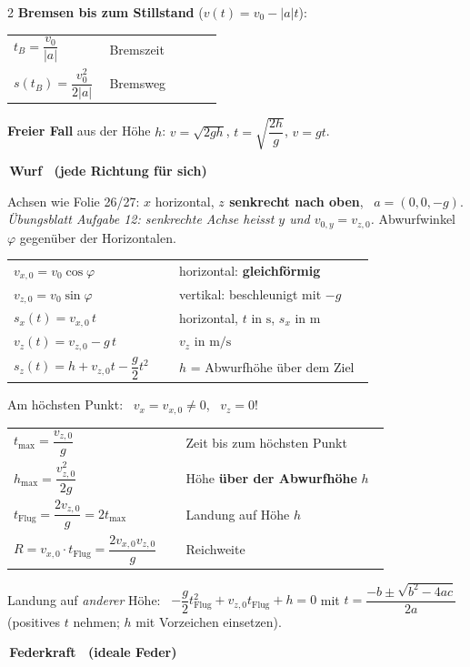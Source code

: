 \documentclass[8pt,a4paper]{extarticle}
\makeatletter
\newcommand{\T}[1]{%
  \vspace{2.2mm plus 0.6mm}%
  \noindent\colorbox{ak}{\color{white}\bfseries\small\,#1\,}\par
  \vspace{0.8mm}\nobreak\ignorespaces}
\newcommand{\FT}[1]{%
  \begin{tabular}{@{}>{\raggedright\arraybackslash}p{0.44\linewidth}@{\hspace{3pt}}>{\raggedright\arraybackslash}p{0.52\linewidth}@{}}
  #1\end{tabular}\par}
\newcommand{\hk}[1]{\textcolor{ak}{\textbf{#1}}}
\makeatother
\begin{document}
\begin{multicols}{2}
\vspace{0.8mm}
\hk{Bremsen bis zum Stillstand} ($v(t)=v_0-|a|t$):

\FT{
$t_B = \dfrac{v_0}{|a|}$ & Bremszeit \\
$s(t_B) = \dfrac{v_0^2}{2|a|}$ & Bremsweg \\
}

\vspace{0.8mm}
\hk{Freier Fall} aus der Höhe $h$: \quad
$v=\sqrt{2gh}$, \quad $t=\sqrt{\dfrac{2h}{g}}$, \quad $v=gt$.

\T{Wurf \ (jede Richtung für sich)}

Achsen wie Folie 26/27: $x$ horizontal, \textbf{$z$ senkrecht nach oben}, \ $a=(0,0,-g)$.
\emph{Übungsblatt Aufgabe 12: senkrechte Achse heisst $y$ und $v_{0,y} = v_{z,0}$.}
Abwurfwinkel $\varphi$ gegenüber der Horizontalen.

\FT{
$v_{x,0} = v_0\cos\varphi$ & horizontal: \textbf{gleichförmig} \\
$v_{z,0} = v_0\sin\varphi$ & vertikal: beschleunigt mit $-g$ \\
$s_x(t) = v_{x,0}\,t$ & horizontal, $t$ in $\mathrm{s}$, $s_x$ in $\mathrm{m}$ \\
$v_z(t) = v_{z,0}-g\,t$ & $v_z$ in $\mathrm{m/s}$ \\
$s_z(t) = h+v_{z,0}t-\dfrac{g}{2}t^2$ & $h$ = Abwurfhöhe über dem Ziel \\
}

\vspace{0.8mm}
Am höchsten Punkt: \ $v_x = v_{x,0}\neq0$, \ $v_z = 0$!

\FT{
$t_{\text{max}} = \dfrac{v_{z,0}}{g}$ & Zeit bis zum höchsten Punkt \\
$h_{\text{max}} = \dfrac{v_{z,0}^2}{2g}$ & Höhe \textbf{über der Abwurfhöhe} $h$ \\
$t_{\text{Flug}} = \dfrac{2v_{z,0}}{g} = 2t_{\text{max}}$ & Landung auf Höhe $h$ \\
$R = v_{x,0}\cdot t_{\text{Flug}} = \dfrac{2v_{x,0}v_{z,0}}{g}$ & Reichweite \\
}

\vspace{0.8mm}
Landung auf \emph{anderer} Höhe: \ $-\dfrac{g}{2}t_{\text{Flug}}^2+v_{z,0}t_{\text{Flug}}+h=0$ mit
$t = \dfrac{-b\pm\sqrt{b^2-4ac}}{2a}$ (positives $t$ nehmen; $h$ mit Vorzeichen einsetzen).

\T{Federkraft \ (ideale Feder)}


\end{multicols}
\end{document}
